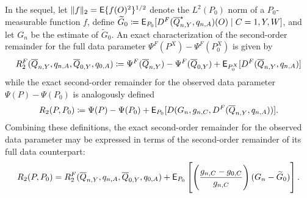 In the sequel, let $\lVert f \rVert_2 = \mathsf{E}\{f(O)^2\}^{1/2}$ denote the
$L^2(P_0)$ norm of a $P_0$-measurable function $f$, define $\widetilde{G}_0
\coloneqq \mathsf{E}_{P_0}[D^F(\overline{Q}^{\star}_{n,Y}, q_{n,A})(O) \mid C = 1, Y,
W]$, and let $G_n$ be the estimate of $\widetilde{G}_0$. An exact
characterization of the second-order remainder for the full data parameter
$\Psi^F(P^X) - \Psi^F(P_0^X)$ is given by
\begin{equation*}
  R^F_2(\overline{Q}_{n,Y}, q_{n,A}, \overline{Q}_{0,Y}, q_{0,A}) \coloneqq
    \Psi^F(\overline{Q}_{n,Y})-\Psi^F(\overline{Q}_{0,Y}) +
    \mathsf{E}_{P^X_0}[D^F(\overline{Q}_{n,Y}, q_{n,A})]
\end{equation*}
while the exact second-order remainder for the observed data parameter
$\Psi(P)-\Psi(P_0)$ is analogously defined
\begin{equation*}
  R_2(P, P_0) \coloneqq \Psi(P) - \Psi(P_0) + \mathsf{E}_{P_0}[D(G_n, g_{n,C},
  D^F(\overline{Q}_{n,Y}, q_{n,A}))].
\end{equation*}
Combining these definitions, the exact second-order remainder for the observed
data parameter may be expressed in terms of the second-order remainder of its
full data counterpart:
\begin{equation*}
  R_2(P, P_0) = R_2^F(\overline{Q}_{n,Y}, q_{n,A}, \overline{Q}_{0,Y}, q_{0,A})
    + \mathsf{E}_{P_0} \left[ \left(\frac{g_{n,C} - g_{0,C}}{g_{n,C}} \right) (G_n -
    \widetilde{G}_0) \right].
\end{equation*}


